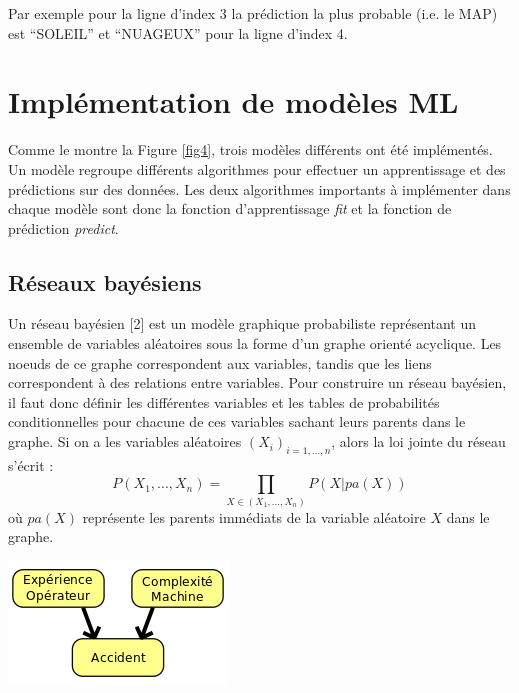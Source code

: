 Par exemple pour la ligne d'index 3 la prédiction la plus probable (i.e. le MAP) est “SOLEIL” et “NUAGEUX” pour la ligne d'index 4.

\section{Implémentation de modèles ML}

Comme le montre la Figure \ref{fig4}, trois modèles différents ont été implémentés. Un modèle regroupe différents algorithmes pour effectuer un apprentissage et des prédictions sur des données. Les deux algorithmes importants à implémenter dans chaque modèle sont donc la fonction d’apprentissage \textit{fit}  et la fonction de prédiction \textit{predict}.


\subsection{Réseaux bayésiens}

Un réseau bayésien [2] est un modèle graphique probabiliste représentant un ensemble de variables
aléatoires sous la forme d'un graphe orienté acyclique. Les noeuds de ce graphe correspondent aux
variables, tandis que les liens correspondent à des relations entre variables. Pour construire un
réseau bayésien, il faut donc définir les différentes variables et les tables de probabilités
conditionnelles pour chacune de ces variables sachant leurs parents dans le graphe. Si on a les variables aléatoires $(X_{i})_{i=1,...,n}$, alors la loi jointe du réseau s’écrit :
$$P(X_{1}, ...,X_{n})= \prod_{X \in (X_{1}, ...,X_{n})} P(X|pa(X))$$
où $pa(X)$ représente les parents immédiats de la variable aléatoire $X$ dans le graphe.

\begin{center}
\includegraphics[scale=0.6]{figures/exemple_RB.png}
\label{fig6}
\end{center}

